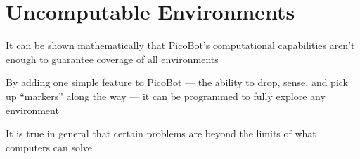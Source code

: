\documentclass[8pt,a4paper,compress]{beamer}
\begin{document}
\section{Uncomputable Environments}
\begin{frame}[fragile]
\pause
It can be shown mathematically that PicoBot's computational capabilities aren't enough to guarantee coverage of all environments

\pause
\bigskip

By adding one simple feature to PicoBot --- the ability to drop, sense, and pick up ``markers'' along the way --- it can be programmed to fully explore any environment

\pause
\bigskip

It is true in general that certain problems are beyond the limits of what computers can solve
\end{frame}
\end{document}

